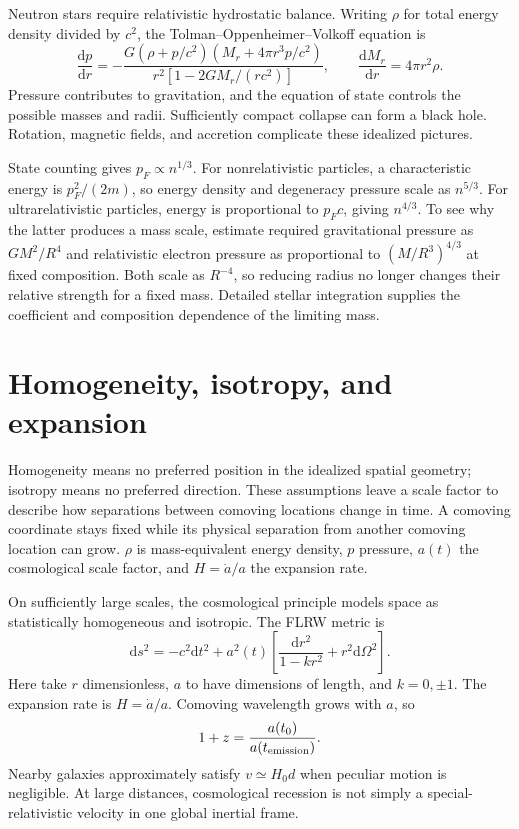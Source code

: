 \documentclass[11pt,oneside]{book}
\newcommand{\dd}{\mathrm{d}}
\newcommand{\od}[2]{\frac{\dd #1}{\dd #2}}
\theoremstyle{reviewstyle}
\begin{document}
Neutron stars require relativistic hydrostatic balance. Writing $\rho$ for total energy density divided by $c^2$, the Tolman--Oppenheimer--Volkoff equation is
\begin{equation}
\od{p}{r}=-\frac{G(\rho+p/c^2)(M_r+4\pi r^3p/c^2)}{r^2[1-2GM_r/(rc^2)]},\qquad
\od{M_r}{r}=4\pi r^2\rho.
\end{equation}
Pressure contributes to gravitation, and the equation of state controls the possible masses and radii. Sufficiently compact collapse can form a black hole. Rotation, magnetic fields, and accretion complicate these idealized pictures.

State counting gives $p_F\propto n^{1/3}$. For nonrelativistic particles, a characteristic energy is $p_F^2/(2m)$, so energy density and degeneracy pressure scale as $n^{5/3}$. For ultrarelativistic particles, energy is proportional to $p_Fc$, giving $n^{4/3}$. To see why the latter produces a mass scale, estimate required gravitational pressure as $GM^2/R^4$ and relativistic electron pressure as proportional to $(M/R^3)^{4/3}$ at fixed composition. Both scale as $R^{-4}$, so reducing radius no longer changes their relative strength for a fixed mass. Detailed stellar integration supplies the coefficient and composition dependence of the limiting mass.

\section{Homogeneity, isotropy, and expansion}
Homogeneity means no preferred position in the idealized spatial geometry; isotropy means no preferred direction. These assumptions leave a scale factor to describe how separations between comoving locations change in time. A comoving coordinate stays fixed while its physical separation from another comoving location can grow. $\rho$ is mass-equivalent energy density, $p$ pressure, $a(t)$ the cosmological scale factor, and $H=\dot a/a$ the expansion rate.

On sufficiently large scales, the cosmological principle models space as statistically homogeneous and isotropic. The FLRW metric is
\begin{equation}\dd s^2=-c^2\dd t^2+a^2(t)\left[\frac{\dd r^2}{1-kr^2}+r^2\dd\Omega^2\right].\end{equation}
Here take $r$ dimensionless, $a$ to have dimensions of length, and $k=0,\pm1$. The expansion rate is $H=\dot a/a$. Comoving wavelength grows with $a$, so
\begin{equation}1+z=\frac{a(t_0)}{a(t_{\rm emission})}.\end{equation}
Nearby galaxies approximately satisfy $v\simeq H_0d$ when peculiar motion is negligible. At large distances, cosmological recession is not simply a special-relativistic velocity in one global inertial frame.
\end{document}
